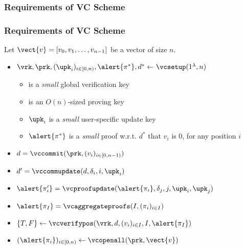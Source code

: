 \subsubsection{Requirements of VC Scheme}
\begin{frame}
    \frametitle{Requirements of VC Scheme}

    Let $\vect{v}=[v_0, v_1, \dots, v_{n-1}]$ be a vector of size $n$.\pause

    \begin{itemize}
        \item $\vrk,\prk,(\upk_i)_{i\in[0,n)},\alert{\pi^*}, d^* \leftarrow \vcsetup(1^\lambda, n)$\pause
        \begin{itemize}
            \item \vrk is a \textit{small} global \alert{verification key}\pause
            \item \prk is an $O(n)$-sized \alert{proving key}\pause
            \item $\upk_i$ is a \textit{small} user-specific \alert{update key}\pause
            \item $\alert{\pi^*}$ is a \textit{small} proof w.r.t. $d^*$ that $v_i$ is 0, for any position $i$\pause
        \end{itemize}
        \item $d=\vccommit(\prk,(v_i)_{i\in [0,n-1)})$\pause
        \item $d'=\vccommupdate(d, \delta_i, i, \upk_i)$\pause
        \item $\alert{\pi_i'} = \vcproofupdate(\alert{\pi_i}, \delta_j, j, \upk_i, \upk_j)$\pause
        \item $\alert{\pi_I} = \vcaggregateproofs(I, (\pi_i)_{i\in I})$\pause
        \item $\{T,F\}\leftarrow \vcverifypos(\vrk, d, (v_i)_{i\in I}, I, \alert{\pi_I})$\pause
        \item $(\alert{\pi_i})_{i\in[0,n)} \leftarrow \vcopenall(\prk, \vect{v})$\pause
    \end{itemize}
\end{frame}